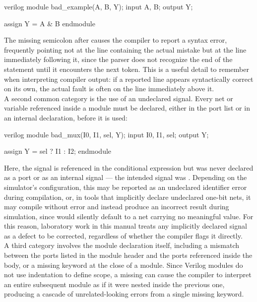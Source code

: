 \begin{codeblock}{verilog}
module bad_example(A, B, Y);
    input A, B;
    output Y;

    assign Y = A & B
endmodule
\end{codeblock}

The missing semicolon after  causes the compiler to report a syntax error, frequently pointing not at the line containing the actual mistake but at the line immediately following it, since the parser does not recognize the end of the statement until it encounters the next token. This is a useful detail to remember when interpreting compiler output: if a reported line appears syntactically correct on its own, the actual fault is often on the line immediately above it.\\

A second common category is the use of an undeclared signal. Every net or variable referenced inside a module must be declared, either in the port list or in an internal declaration, before it is used:\\

\begin{codeblock}{verilog}
module bad_mux(I0, I1, sel, Y);
    input I0, I1, sel;
    output Y;

    assign Y = sel ? I1 : I2;
endmodule
\end{codeblock}

Here, the signal  is referenced in the conditional expression but was never declared as a port or as an internal signal --- the intended signal was . Depending on the simulator's configuration, this may be reported as an undeclared identifier error during compilation, or, in tools that implicitly declare undeclared one-bit nets, it may compile without error and instead produce an incorrect result during simulation, since  would silently default to a net carrying no meaningful value. For this reason, laboratory work in this manual treats any implicitly declared signal as a defect to be corrected, regardless of whether the compiler flags it directly.\\

A third category involves the module declaration itself, including a mismatch between the ports listed in the module header and the ports referenced inside the body, or a missing  keyword at the close of a module. Since Verilog modules do not use indentation to define scope, a missing  can cause the compiler to interpret an entire subsequent module as if it were nested inside the previous one, producing a cascade of unrelated-looking errors from a single missing keyword.\\

